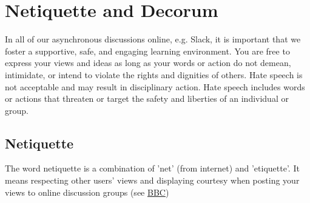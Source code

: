 \documentclass{article}
\begin{document}
 \section{Netiquette and Decorum}
 In all of our asynchronous discussions online, e.g. Slack,  it is important that we foster a supportive, safe, 
 and engaging learning environment.
 You are free to express your views and ideas as long as your words or action do not demean, intimidate, or intend
  to violate the rights and dignities of others. Hate speech is not acceptable and may result in disciplinary action. 
  Hate speech includes words or actions that threaten or target the safety and liberties of an individual or group.
   
  \subsection{Netiquette}
 The word netiquette is a combination of ’net’ (from internet) and ’etiquette’. It means respecting other users’ views and displaying 
 courtesy when posting your views to online discussion groups (see \href{https://www.bbc.co.uk/webwise/guides/about-netiquette}{BBC})
\end{document}
